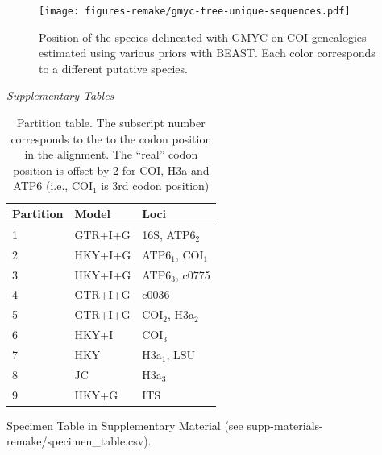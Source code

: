 \documentclass[12pt,letterpaper]{article}\usepackage[]{graphicx}\usepackage[]{color}
\renewcommand{\subsection}[1]{%
\bigskip
\begin{center}
\begin{large}
\normalfont\itshape #1
\end{large}
\end{center}}
\begin{document}
\begin{figure}
  {\centering \texttt{[image: figures-remake/gmyc-tree-unique-sequences.pdf]}}
  \caption{Position of the species delineated with GMYC on COI genealogies
    estimated using various priors with BEAST. Each color corresponds to a
    different putative species.}\label{fig:gmyc-tree-plot-uniqSeq}
\end{figure}


\clearpage


\subsection{Supplementary Tables}

\begin{table}[h]
  \centering
  \caption{Partition table. The subscript number corresponds to
    the to the codon position in the alignment. The ``real'' codon position is
    offset by 2 for COI, H3a and ATP6 (i.e., COI$_1$ is 3rd codon position)}
  \begin{tabular} { l l l }
    \hline
    Partition & Model   & Loci              \\
    \hline
    1      & GTR+I+G    & 16S, ATP6$_2$     \\
    2      & HKY+I+G    & ATP6$_1$, COI$_1$ \\
    3      & HKY+I+G    & ATP6$_3$, c0775   \\
    4      & GTR+I+G    & c0036             \\
    5      & GTR+I+G    & COI$_2$, H3a$_2$  \\
    6      & HKY+I      & COI$_3$           \\
    7      & HKY        & H3a$_1$, LSU      \\
    8      & JC         & H3a$_3$           \\
    9      & HKY+G      & ITS               \\
    \hline
  \end{tabular}
  \label{tab:sm-partitions}
\end{table}


Specimen Table in Supplementary Material (see
\textsf{supp-materials-remake/specimen\_table.csv}). \label{tab:specimen-table}


\end{document}
